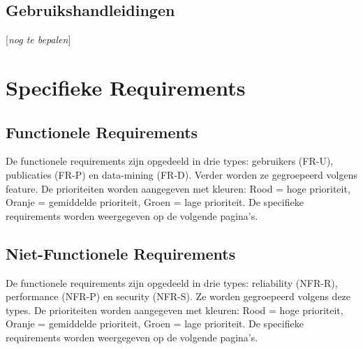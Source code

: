 \documentclass{article}
\begin{document}
\subsection{Gebruikshandleidingen}

[{\it nog te bepalen}]




\clearpage
\section{Specifieke Requirements}
\label{sec:systemRequirements}


\subsection{Functionele Requirements}
\noindent De functionele requirements zijn opgedeeld in drie types: gebruikers (FR-U), publicaties (FR-P) en data-mining (FR-D). Verder worden ze gegroepeerd volgens feature. De prioriteiten worden aangegeven met kleuren: Rood = hoge prioriteit, Oranje = gemiddelde prioriteit, Groen = lage prioriteit. De specifieke requirements worden weergegeven op de volgende pagina's.

\subsection{Niet-Functionele Requirements}
\noindent De functionele requirements zijn opgedeeld in drie types: reliability (NFR-R), performance (NFR-P) en security (NFR-S). Ze  worden gegroepeerd volgens deze types. De prioriteiten worden aangegeven met kleuren: Rood = hoge prioriteit, Oranje = gemiddelde prioriteit, Groen = lage prioriteit. De specifieke requirements worden weergegeven op de volgende pagina's.


\end{document}

